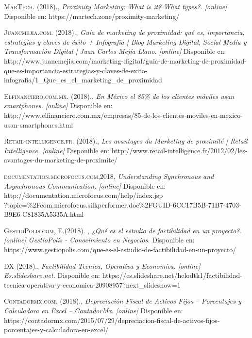 \begin{thebibliography}{}
 \textsc{ MarTech. (2018).}, 
\textit{Proximity Marketing: What is it? What types?. [online]}
Disponible en: https://martech.zone/proximity-marketing/

 \textsc{Juancmejia.com. (2018).}, 
\textit{Guía de marketing de proximidad: qué es, importancia, estrategias y claves de éxito + Infografía | Blog Marketing Digital, Social Media y Transformación Digital | Juan Carlos Mejía Llano. [online] }
Disponible en: http://www.juancmejia.com/marketing-digital/guia-de-marketing-de-proximidad-que-es-importancia-estrategias-y-claves-de-exito-infografia/1\_Que\_es\_el\_marketing\_de\_proximidad 

 \textsc{Elfinanciero.com.mx. (2018).},
\textit{  En México el 85\% de los clientes móviles usan smartphones. [online]}
Disponible en: http://www.elfinanciero.com.mx/empresas/85-de-los-clientes-moviles-en-mexico-usan-smartphones.html 

 \textsc{Retail-intelligence.fr. (2018).}, 
\textit{Les avantages du Marketing de proximité | Retail Intelligence. [online]}
Disponible en: http://www.retail-intelligence.fr/2012/02/les-avantages-du-marketing-de-proximite/

 \textsc{documentation.microfocus.com,2018}, 
\textit{Understanding Synchronous and Asynchronous Communication. [online]}
Disponible en: http://documentation.microfocus.com/help/index.jsp\\?topic=\%2Fcom.microfocus.silkperformer.doc\%2FGUID-6CC17B5B-71B7-4703-B9E6-C81835A5335A.html

 \textsc{GestioPolis.com, E.(2018). }, 
\textit{¿Qué es el estudio de factibilidad en un proyecto?. [online] GestioPolis - Conocimiento en Negocios. }
Disponible en: https://www.gestiopolis.com/que-es-el-estudio-de-factibilidad-en-un-proyecto/

 \textsc{DX (2018).}, 
\textit{Factibilidad Tecnica, Operativa y Economica. [online] Es.slideshare.net.}
Disponible en: https://es.slideshare.net/helodtk1/factibilidad-tecnica-operativa-y-economica-20908957?next\_slideshow=1 

 \textsc{Contadormx.com. (2018).}, 
\textit{Depreciación Fiscal de Activos Fijos – Porcentajes y Calculadora en Excel – ContadorMx. [online] }
Disponible en: https://contadormx.com/2015/07/29/depreciacion-fiscal-de-activos-fijos-porcentajes-y-calculadora-en-excel/ 


\end{thebibliography}
